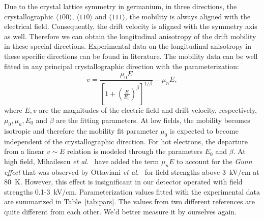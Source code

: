 Due to the crystal lattice symmetry in germanium, in three directions, the crystallographic $\langle100\rangle$, $\langle110\rangle$ and $\langle111\rangle$, the mobility is always aligned with the electrical field. Consequently, the drift velocity is aligned with the symmetry axis as well. Therefore we can obtain the longitudinal anisotropy of the drift mobility in these special directions. Experimental data on the longitudinal anisotropy in these specific directions can be found in literature. The mobility data can be well fitted in any principal crystallographic direction with the parameterization:
\begin{equation}
  \label{eq:para}
  v = \frac{\mu_{0}E}{[1+(\frac{E}{E_{0}})^{\beta}]^{1/\beta}} -   \mu_{n}E,
\end{equation}
where $E, v$ are the magnitudes of the electric field and drift velocity, respectively, $\mu_{0}, \mu_{n}, E_{0}$ and $\beta$ are the fitting parameters. At low fields, the mobility becomes isotropic and therefore the mobility fit parameter $\mu_{0}$ is expected to become independent of the crystallographic direction. For hot electrons, the departure from a linear $v \sim E$ relation is modeled through the parameters $E_{0}$ and $\beta$. At high field, Mihailescu \textit{et   al.}~\cite{miha} have added the term $\mu_{n}E$ to account for the \emph{Gunn effect} that was observed by Ottaviani \textit{et   al.}~\cite{otta} for field strengths above 3~kV$/$cm at 80~K. However, this effect is insignificant in our detector operated with field strengths 0.1-3~kV$/$cm. Parameterization values fitted with the experimental data are summarized in Table~\ref{tab:pars}. The values from two different references are quite different from each other. We'd better measure it by ourselves again.

